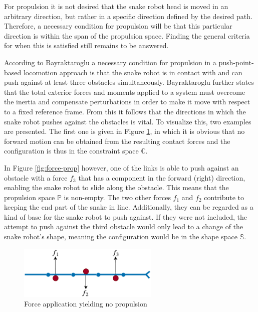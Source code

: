 For propulsion it is not desired that the snake robot head is moved in an arbitrary direction, but rather in a specific direction defined by the desired path. Therefore, a necessary condition for propulsion will be that this particular direction is within the span of the propulsion space. Finding the general criteria for when this is satisfied still remains to be answered.

According to Bayraktaroglu \cite{bayraktaroglu2004understanding} a necessary condition for propulsion in a push-point-based locomotion approach is that the snake robot is in contact with and can push against at least three obstacles simultaneously. Bayraktaroglu \cite{bayraktaroglu2004understanding} further states that the total exterior forces and moments applied to a system must overcome the inertia and compensate perturbations in order to make it move with respect to a fixed reference frame. From this it follows that the directions in which the snake robot pushes against the obstacles is vital. To visualize this, two examples are presented. The first one is given in Figure \ref{fig:force-noprop}, in which it is obvious that no forward motion can be obtained from the resulting contact forces and the configuration is thus in the constraint space $\mathbb{C}$.

In Figure \ref{fig:force-prop} however, one of the links is able to push against an obstacle with a force $f_3$ that has a component in the forward (right) direction, enabling the snake robot to slide along the obstacle. This means that the propulsion space $\mathbb{P}$ is non-empty. The two other forces $f_1$ and $f_2$ contribute to keeping the end part of the snake in line. Additionally, they can be regarded as a kind of base for the snake robot to push against. If they were not included, the attempt to push against the third obstacle would only lead to a change of the snake robot's shape, meaning the configuration would be in the shape space $\mathbb{S}$. 

\begin{figure}[h!]
    \centering
    \includegraphics[width=0.6\textwidth]{figures/theory/obst-push-noprop.pdf}
    \caption{Force application yielding no propulsion}
    \label{fig:force-noprop}
\end{figure}

